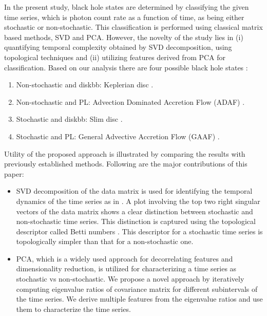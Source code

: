 \documentclass[10pt,conference]{IEEEtran}
\begin{document}
In the present study, black hole states are determined by  classifying the given time series, which is photon count rate as a function of time,  as being either stochastic or non-stochastic. This classification is performed using classical matrix based methods, SVD and PCA.
However, the novelty of the study lies in (i) quantifying temporal complexity obtained by SVD decomposition, using topological techniques and (ii) utilizing features derived from PCA for classification. Based on our analysis there are four possible black hole states \cite{Adegoke2018}:
\begin{enumerate}
\item Non-stochastic and diskbb: Keplerian disc \cite{Shakura1973}.
\item Non-stochastic and PL: Advection Dominated Accretion Flow (ADAF)  \cite{narayan1994}.
\item Stochastic and diskbb: Slim disc \cite{Abramowicz1988}.
\item Stochastic and PL: General Advective Accretion Flow (GAAF) \cite{chakrabarti1995, rajesh2010}.
\end{enumerate}

Utility of the proposed approach is illustrated by comparing the results with previously established methods. Following are the major contributions of this paper:
\begin{itemize}
\item SVD decomposition of the data matrix is used for identifying the temporal dynamics of the time series as in \cite{misra2006}. A plot involving the top two right singular vectors of the data matrix shows a clear distinction between stochastic and non-stochastic time series. This distinction is captured using the topological descriptor called Betti numbers \cite{jmlr}. This descriptor for a stochastic time series is topologically simpler than that for a non-stochastic one.

\item PCA, which is a widely used approach for decorrelating features and dimensionality reduction, is utilized for characterizing a time series as stochastic vs non-stochastic. We propose a novel approach by iteratively computing eigenvalue ratios  of covariance matrix for different subintervals of the time series. We  derive multiple features from the eigenvalue ratios and use them to characterize the time series.
\end{itemize}
\end{document}
